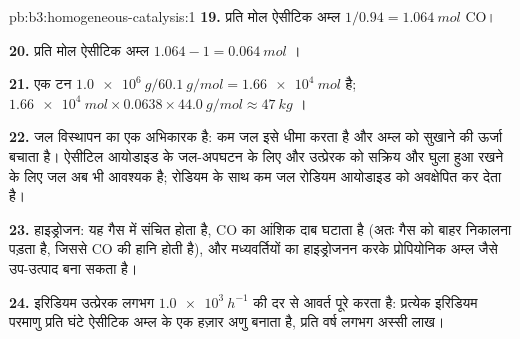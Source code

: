 \begin{solution}{pb:b3:homogeneous-catalysis:1}
\textbf{19.} प्रति मोल ऐसीटिक अम्ल $1/0.94 = \qty{1.064}{mol}$ CO।

\textbf{20.} प्रति मोल ऐसीटिक अम्ल $1.064 - 1 = \qty{0.064}{mol}$ ।

\textbf{21.} एक टन $\qty{1.0e6}{g}/\qty{60.1}{g/mol} = \qty{1.66e4}{mol}$ है; $\qty{1.66e4}{mol} \times 0.0638 \times \qty{44.0}{g/mol} \approx \qty{47}{kg}$ ।

\textbf{22.} जल विस्थापन का एक अभिकारक है: कम जल इसे धीमा करता है और अम्ल को सुखाने की
ऊर्जा बचाता है। ऐसीटिल आयोडाइड के जल-अपघटन के लिए और
उत्प्रेरक को सक्रिय और घुला हुआ रखने के लिए जल अब भी आवश्यक है; रोडियम के साथ कम जल रोडियम
आयोडाइड को अवक्षेपित कर देता है।

\textbf{23.} हाइड्रोजन: यह गैस में संचित होता है, CO का आंशिक दाब घटाता है
(अतः गैस को बाहर निकालना पड़ता है, जिससे CO की हानि होती है), और मध्यवर्तियों का हाइड्रोजनन करके
प्रोपियोनिक अम्ल जैसे उप-उत्पाद बना सकता है।

\textbf{24.} इरिडियम उत्प्रेरक लगभग $\qty{1.0e3}{h^{-1}}$ की दर से आवर्त पूरे करता है: प्रत्येक इरिडियम परमाणु
प्रति घंटे ऐसीटिक अम्ल के एक हज़ार अणु बनाता है, प्रति वर्ष लगभग अस्सी लाख।
\end{solution}
